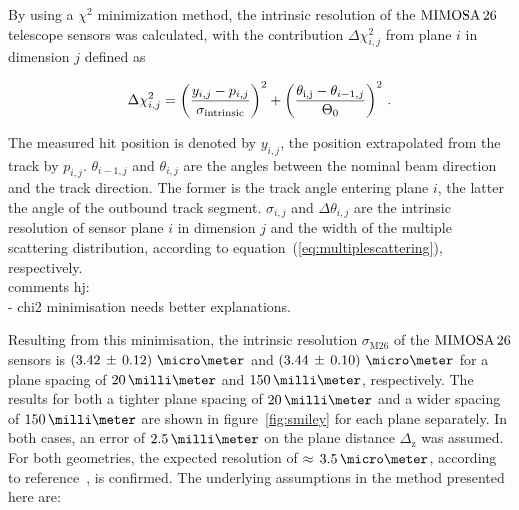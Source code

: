 By using a $\chi^{2}$ minimization method, the intrinsic resolution of the $\textrm{MIMOSA\,26}$ telescope sensors was calculated, with the contribution $\Delta \chi^2_{i,j}$ from plane $i$ in dimension $j$ defined as

\begin{equation}
\Delta \chi^2_{i,j} = \left( \frac{y_{i,j} - p_{i,j}}{\sigma_{\textrm{intrinsic}}} \right)^2 +
\left( \frac{\theta_{\textrm{i,j}} - \theta_{i-1,j}}{\Theta_{0}} \right)^2 \,.
\end{equation}

\noindent The measured hit position is denoted by $y_{i,j}$, the position extrapolated from the track by $p_{i,j}$. $\theta_{i-1,j}$ and $\theta_{i,j}$ are the angles between the nominal beam direction
 and the track direction. The former is the track angle entering plane $i$, the latter the angle of the outbound track segment.
$\sigma_{i,j}$ and $\Delta \theta_{i,j}$ are the intrinsic resolution of sensor plane $i$ in dimension $j$ and the width of the multiple scattering distribution,
 according to equation~(\ref{eq:multiplescattering}), respectively.
\\comments hj: \\
- chi2 minimisation needs better explanations. 

Resulting from this minimisation, the intrinsic resolution $\sigma_{\textrm{M26}}$ of the $\textrm{MIMOSA\,26}$ sensors is \allowbreak$\left( 3.42\,\pm\, \allowbreak 0.12 \right)\,\micro\meter$
 and $\left( 3.44\,\pm\,0.10 \right)\,\micro\meter$ for a plane spacing of $20\,\milli\meter$ and $150\,\milli\meter$, respectively.
The results for both a tighter plane spacing of $20\,\milli\meter$ and a wider spacing of $150\,\milli\meter$ are shown in figure~\ref{fig:smiley} for each plane separately. 
In both cases, an error of $2.5\,\milli\meter$ on the plane distance $\Delta_{\textrm{z}}$ was assumed.
For both geometries, the expected resolution of $\approx\,3.5\,\micro\meter$, according to reference~\cite{ref:mimosa26}, is confirmed.
The underlying assumptions in the method presented here are:

